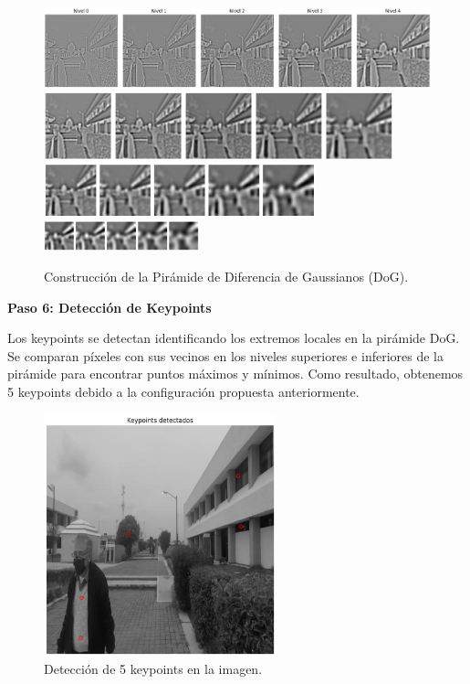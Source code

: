\documentclass[a4paper]{article}
\begin{document}
\begin{figure}[H]
    \centering
    \includegraphics[width=1.1\textwidth]{images/sift_paso_4.1.png}
    \includegraphics[width=0.9\textwidth]{images/sift_paso_4.2.png}
    \includegraphics[width=0.7\textwidth]{images/sift_paso_4.3.png}
    \includegraphics[width=0.4\textwidth]{images/sift_paso_4.4.png}
    \caption{Construcción de la Pirámide de Diferencia de Gaussianos (DoG).}
\end{figure}

\textbf{Paso 6: Detección de Keypoints}
\par\vspace{0.5cm}

Los keypoints se detectan identificando los extremos locales en la pirámide DoG. Se comparan píxeles con sus vecinos en los niveles superiores e inferiores de la pirámide para encontrar puntos máximos y mínimos. Como resultado, obtenemos 5 keypoints debido a la configuración propuesta anteriormente. 

\begin{figure}[H]
    \centering
    \includegraphics[width=0.6\textwidth]{images/sift_paso_5.1.png}
    \caption{Detección de 5 keypoints en la imagen.}
\end{figure}
\end{document}

